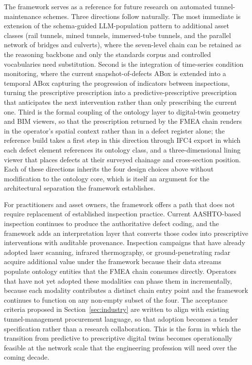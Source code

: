 \documentclass[11pt,a4paper]{article}
\begin{document}
The framework serves as a reference for future research on automated tunnel-maintenance schemes. Three directions follow naturally. The most immediate is extension of the schema-guided LLM-population pattern to additional asset classes (rail tunnels, mined tunnels, immersed-tube tunnels, and the parallel network of bridges and culverts), where the seven-level chain can be retained as the reasoning backbone and only the standards corpus and controlled vocabularies need substitution. Second is the integration of time-series condition monitoring, where the current snapshot-of-defects ABox is extended into a temporal ABox capturing the progression of indicators between inspections, turning the prescriptive prescription into a predictive-prescriptive prescription that anticipates the next intervention rather than only prescribing the current one. Third is the formal coupling of the ontology layer to digital-twin geometry and BIM viewers, so that the prescription returned by the FMEA chain renders in the operator's spatial context rather than in a defect register alone; the reference build takes a first step in this direction through IFC4 export in which each defect element references its ontology class, and a three-dimensional lining viewer that places defects at their surveyed chainage and cross-section position. Each of these directions inherits the four design choices above without modification to the ontology core, which is itself an argument for the architectural separation the framework establishes.

For practitioners and asset owners, the framework offers a path that does not require replacement of established inspection practice. Current AASHTO-based inspection continues to produce the authoritative defect coding, and the framework adds an interpretation layer that converts those codes into prescriptive interventions with auditable provenance. Inspection campaigns that have already adopted laser scanning, infrared thermography, or ground-penetrating radar acquire additional value under the framework because their data streams populate ontology entities that the FMEA chain consumes directly. Operators that have not yet adopted these modalities can phase them in incrementally, because each modality contributes a distinct chain entry point and the framework continues to function on any non-empty subset of the four. The acceptance criteria proposed in Section~\ref{sec:industry} are written to align with existing tunnel-management procurement language, so that adoption becomes a tender specification rather than a research collaboration. This is the form in which the transition from predictive to prescriptive digital twins becomes operationally feasible at the network scale that the engineering profession will need over the coming decade.
\end{document}
